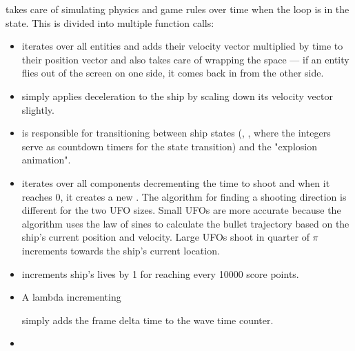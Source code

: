 \documentclass[
  digital, %
  color,   %
  table,   %
  oneside, %
  lof,     %
  lot,     %
]{fithesis3}
\begin{document}
 takes care of simulating physics and game rules
over time when the loop is in the  state.
This is divided into multiple function calls:
\begin{itemize}[-]
    
    \item  {}

    iterates over all entities and adds their velocity vector multiplied
    by time  to their position vector and also takes care
    of wrapping the space — if an entity flies out of the screen on one side,
    it comes back in from the other side.

    \item {}

    simply applies deceleration to the ship by scaling down its velocity vector slightly.

    \item {}

    is responsible for transitioning between ship states
    (, , 
    where the integers serve as countdown timers for the state transition)
    and the "explosion animation".

    \item {}

    iterates over all  components decrementing the time to
    shoot and when it reaches 0, it creates a new .
    The algorithm for finding a shooting direction is different for the two UFO sizes.
    Small UFOs are more accurate because the algorithm uses
    the law of sines to calculate the bullet trajectory based on the ship's current
    position and velocity. Large UFOs shoot in quarter of $\pi$ increments
    towards the ship's current location.

    \item {}

    increments ship's lives by 1 for reaching every 10000 score points.

    \item A lambda incrementing 

    simply adds the frame delta time  to the wave time counter.

    \item {}


\end{itemize}
\end{document}
